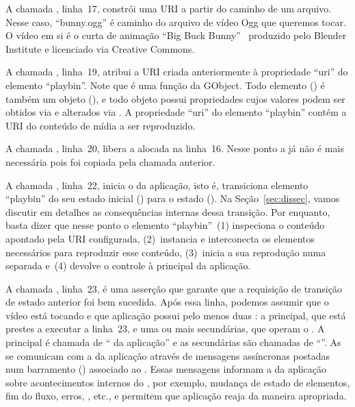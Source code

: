 \documentclass{SBCbookchapter}
\begin{document}
A chamada , linha~17, constrói uma URI a partir do
caminho de um arquivo.  Nesse caso, ``bunny.ogg'' é caminho do arquivo de
vídeo Ogg que queremos tocar.  O vídeo em si é o curta de animação ``Big
Buck Bunny''~\cite{bunny} produzido pelo Blender Institute e licenciado via
Creative Commons.

A chamada , linha~19, atribui a URI criada anteriormente à
propriedade ``uri'' do elemento ``playbin''.  Note que  é
uma função da GObject.  Todo elemento () é também um objeto
(), e todo objeto possui propriedades cujos valores podem ser
obtidos via  e alterados via .
A propriedade ``uri'' do elemento ``playbin'' contém a URI do conteúdo de
mídia a ser reproduzido.

A chamada , linha~20, libera a  alocada na linha~16.
Nesse ponto a  já não é mais necessária pois foi copiada pela
chamada  anterior.

A chamada , linha~22, inicia o  da
aplicação, isto é, transiciona elemento ``playbin'' do seu estado inicial
 () para o estado 
().  Na Seção~\ref{sec:dissec}, vamos discutir em
detalhes as consequências internas dessa transição.  Por enquanto, basta
dizer que nesse ponto o elemento ``playbin''~(1) inspeciona o conteúdo
apontado pela URI configurada, (2)~instancia e interconecta os elementos
necessários para reproduzir esse conteúdo, (3)~inicia a sua reprodução numa
 separada e~(4) devolve o controle à  principal da
aplicação.

A chamada , linha~23, é uma asserção que garante que a
requisição de transição de estado anterior foi bem sucedida.  Após essa
linha, podemos assumir que o vídeo está tocando e que aplicação possui pelo
menos duas : a  principal, que está prestes a
executar a linha~23, e uma ou mais  secundárias, que operam o
.  A  principal é chamada de `` da
aplicação'' e as  secundárias são chamadas de ``''.  As  se comunicam com a  da
aplicação através de mensagens assíncronas postadas num barramento
() associado ao .  Essas mensagens informam a
 da aplicação sobre acontecimentos internos do , por
exemplo, mudança de estado de elementos, fim do fluxo, erros, ,
etc., e permitem que aplicação reaja da maneira apropriada.
\end{document}
